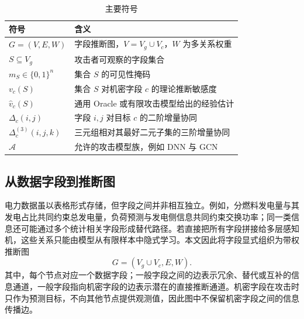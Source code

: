 \documentclass[UTF8,a4paper,zihao=5,fontset=fandol]{ctexart}
\begin{document}
\begin{table}[H]
  \centering
  \caption{主要符号}
  \label{tab:notation}
  \begin{tabularx}{0.94\textwidth}{@{}lX@{}}
    \toprule
    符号 & 含义\\
    \midrule
    $G=(V,E,W)$ & 字段推断图，$V=V_g\cup V_c$，$W$ 为多关系权重\\
    $S\subseteq V_g$ & 攻击者可观察的字段集合\\
    $m_S\in\{0,1\}^{n}$ & 集合 $S$ 的可见性掩码\\
    $v_c(S)$ & 集合 $S$ 对机密字段 $c$ 的理论推断敏感度\\
    $\widehat v_c(S)$ & 通用 Oracle 或有限攻击模型给出的经验估计\\
    $\Delta_c(i,j)$ & 字段 $i,j$ 对目标 $c$ 的二阶增量协同\\
    $\Delta_c^{(3)}(i,j,k)$ & 三元组相对其最好二元子集的三阶增量协同\\
    $\mathcal A$ & 允许的攻击模型族，例如 DNN 与 GCN\\
    \bottomrule
  \end{tabularx}
\end{table}

\subsection{从数据字段到推断图}

电力数据虽以表格形式存储，但字段之间并非相互独立。例如，分燃料发电量与其发电占比共同约束总发电量，负荷预测与发电侧信息共同约束交换功率；同一类信息还可能通过多个统计相关字段形成替代路径。若直接把所有字段拼接给多层感知机，这些关系只能由模型从有限样本中隐式学习。本文因此将字段显式组织为带权推断图
\begin{equation}
  G=(V_g\cup V_c,E,W).
\end{equation}
其中，每个节点对应一个数据字段；一般字段之间的边表示冗余、替代或互补的信息通道，一般字段指向机密字段的边表示潜在的直接推断通道。机密字段在攻击时只作为预测目标，不向其他节点提供观测值，因此图中不保留机密字段之间的信息传播边。
\end{document}
